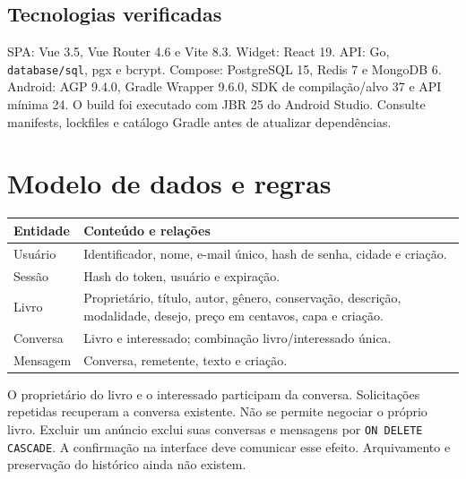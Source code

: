 \documentclass[11pt,a4paper]{article}
\begin{document}
\subsection{Tecnologias verificadas}
SPA: Vue 3.5, Vue Router 4.6 e Vite 8.3. Widget: React 19. API: Go, \texttt{database/sql}, pgx e bcrypt. Compose: PostgreSQL 15, Redis 7 e MongoDB 6.
Android: AGP 9.4.0, Gradle Wrapper 9.6.0, SDK de compilação/alvo 37 e API mínima 24. O build foi executado com JBR 25 do Android Studio. Consulte manifests, lockfiles e catálogo Gradle antes de atualizar dependências.
\section{Modelo de dados e regras}
\par\medskip\noindent\begin{tabularx}{\textwidth}{@{}p{27mm}Y@{}}\toprule Entidade & Conteúdo e relações\\\midrule
Usuário & Identificador, nome, e-mail único, hash de senha, cidade e criação.\\
Sessão & Hash do token, usuário e expiração.\\
Livro & Proprietário, título, autor, gênero, conservação, descrição, modalidade, desejo, preço em centavos, capa e criação.\\
Conversa & Livro e interessado; combinação livro/interessado única.\\
Mensagem & Conversa, remetente, texto e criação.\\\bottomrule\end{tabularx}\par\medskip
O proprietário do livro e o interessado participam da conversa. Solicitações repetidas recuperam a conversa existente. Não se permite negociar o próprio livro.
Excluir um anúncio exclui suas conversas e mensagens por \texttt{ON DELETE CASCADE}. A confirmação na interface deve comunicar esse efeito. Arquivamento e preservação do histórico ainda não existem.
\end{document}
